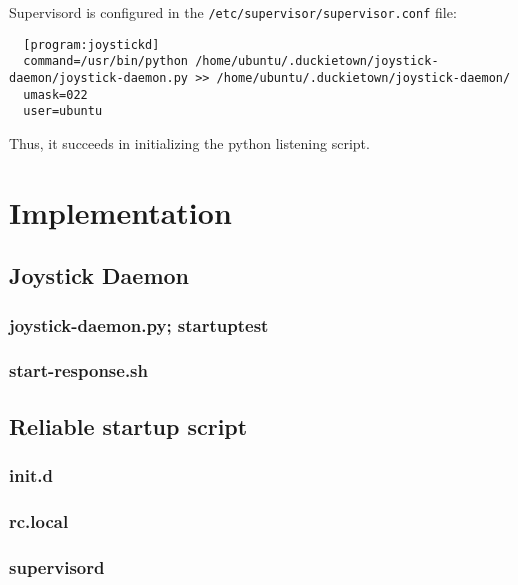 \documentclass[titlepage]{article}
\begin{document}
Supervisord is configured in the \texttt{/etc/supervisor/supervisor.conf} file:

\begin{lstlisting}
  [program:joystickd]
  command=/usr/bin/python /home/ubuntu/.duckietown/joystick-daemon/joystick-daemon.py >> /home/ubuntu/.duckietown/joystick-daemon/
  umask=022
  user=ubuntu
\end{lstlisting}

Thus, it succeeds in initializing the python listening script.
\section{Implementation}
\subsection{Joystick Daemon}
\subsubsection{joystick-daemon.py; startuptest}
\subsubsection{start-response.sh}
\subsection{Reliable startup script} %
\subsubsection{init.d}
\subsubsection{rc.local}
\subsubsection{supervisord}
\end{document}
